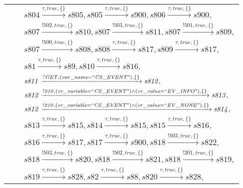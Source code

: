 \begin{tabular}{lcl}
& & $\mathit{s804}\xrightarrow{\mathit{\tau}, \mathit{true}, \{\}}\mathit{s805},\mathit{s805}\xrightarrow{\mathit{\tau}, \mathit{true}, \{\}}\mathit{s900},\mathit{s806}\xrightarrow{\mathit{\tau}, \mathit{true}, \{\}}\mathit{s900},$ \\
& & $\mathit{s807}\xrightarrow{\mathit{!502}, \mathit{true}, \{\}}\mathit{s810},\mathit{s807}\xrightarrow{\mathit{!503}, \mathit{true}, \{\}}\mathit{s811},\mathit{s807}\xrightarrow{\mathit{!501}, \mathit{true}, \{\}}\mathit{s809},$ \\
& & $\mathit{s807}\xrightarrow{\mathit{!500}, \mathit{true}, \{\}}\mathit{s808},\mathit{s808}\xrightarrow{\mathit{\tau}, \mathit{true}, \{\}}\mathit{s817},\mathit{s809}\xrightarrow{\mathit{\tau}, \mathit{true}, \{\}}\mathit{s817},$ \\
& & $\mathit{s81}\xrightarrow{\mathit{\tau}, \mathit{true}, \{\}}\mathit{s89},\mathit{s810}\xrightarrow{\mathit{\tau}, \mathit{true}, \{\}}\mathit{s816},$ \\
& & $\mathit{s811}\xrightarrow{\mathit{?GET}, \mathit{(var\_name = ``CS\_EVENT")}, \{\}}\mathit{s812},$ \\
& & $\mathit{s812}\xrightarrow{\mathit{!210}, \mathit{(cr\_variable = ``CS\_EVENT") \land (cr\_value = ``EV\_INFO")}, \{\}}\mathit{s813},$ \\
& & $\mathit{s812}\xrightarrow{\mathit{!210}, \mathit{(cr\_variable = ``CS\_EVENT") \land (cr\_value = ``EV\_NONE")}, \{\}}\mathit{s814},$ \\
& & $\mathit{s813}\xrightarrow{\mathit{\tau}, \mathit{true}, \{\}}\mathit{s815},\mathit{s814}\xrightarrow{\mathit{\tau}, \mathit{true}, \{\}}\mathit{s815},\mathit{s815}\xrightarrow{\mathit{\tau}, \mathit{true}, \{\}}\mathit{s816},$ \\
& & $\mathit{s816}\xrightarrow{\mathit{\tau}, \mathit{true}, \{\}}\mathit{s817},\mathit{s817}\xrightarrow{\mathit{\tau}, \mathit{true}, \{\}}\mathit{s900},\mathit{s818}\xrightarrow{\mathit{!503}, \mathit{true}, \{\}}\mathit{s822},$ \\
& & $\mathit{s818}\xrightarrow{\mathit{!503}, \mathit{true}, \{\}}\mathit{s820},\mathit{s818}\xrightarrow{\mathit{!502}, \mathit{true}, \{\}}\mathit{s821},\mathit{s818}\xrightarrow{\mathit{!201}, \mathit{true}, \{\}}\mathit{s819},$ \\
& & $\mathit{s819}\xrightarrow{\mathit{\tau}, \mathit{true}, \{\}}\mathit{s828},\mathit{s82}\xrightarrow{\mathit{\tau}, \mathit{true}, \{\}}\mathit{s88},\mathit{s820}\xrightarrow{\mathit{\tau}, \mathit{true}, \{\}}\mathit{s828},$ \\

\end{tabular}

